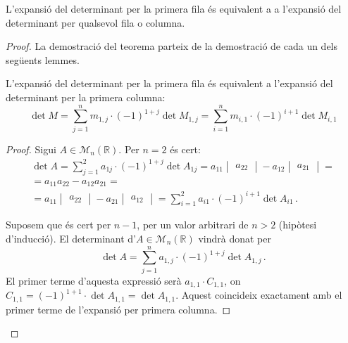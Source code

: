 \begin{teo}\label{teo:laplace}
	L'expansió del determinant per la primera fila és equivalent a a l'expansió del determinant per qualsevol fila o columna.

\begin{proof}
	La demostració del teorema parteix de la demostració de cada un dels següents lemmes.
\begin{lema}\label{lema:columna}
		L'expansió del determinant per la primera fila és equivalent a l'expansió del determinant per la primera columna: \[\det M = \sum_{j=1}^{n} m_{1,j}\cdot(-1)^{1+j}\det M_{1,j} = \sum_{i=1}^{n} m_{i,1}\cdot(-1)^{i+1}\det M_{i,1} \]
		\begin{adjustwidth}{0.8cm}{}
		\begin{proof}
		Sigui $A \in \mathcal{M}_n(\mathbb{R})$. Per $n = 2$ és cert:
		\begin{equation*}
		\begin{gathered}		
		\det A = 
		\sum_{j=1}^{2} a_{1j}\cdot (-1)^{1+j}\det A_{1j} = a_{11}\begin{vmatrix}a_{22}\end{vmatrix} - a_{12}\begin{vmatrix}a_{21}\end{vmatrix} =\\
%
		=a_{11}a_{22} - a_{12}a_{21} =\\
%
		 =a_{11}\begin{vmatrix}a_{22}\end{vmatrix} - a_{21}\begin{vmatrix}a_{12}\end{vmatrix} = \sum_{i=1}^{2} a_{i1}\cdot (-1)^{i+1}\det A_{i1}\,.
		\end{gathered}
		\end{equation*}
		
		Suposem que és cert per $n-1$, per un valor arbitrari de $n>2$ (hipòtesi d'inducció). El determinant d'$A\in\mathcal{M}_n(\mathbb{R})$ vindrà donat per
		\begin{equation}\label{eq:det1}
			 \det A = \sum_{j=1}^{n} a_{1,j}\cdot(-1)^{1+j}\det A_{1,j}  \,.
		\end{equation} 
		El primer terme d'aquesta expressió serà $a_{1,1}\cdot C_{1,1}$, on $C_{1,1} =(-1)^{1+1}\cdot\det A_{1,1} = \det A_{1,1}$. Aquest coincideix exactament amb el primer terme de l'expansió per primera columna. 
		

\end{proof}
\end{adjustwidth}
\end{lema}
\end{proof}
\end{teo}
